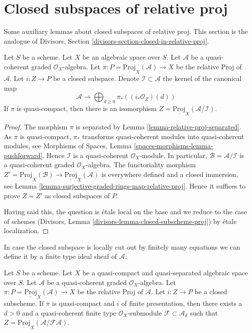 \section{Closed subspaces of relative proj}
\label{section-closed-in-relative-proj}

\noindent
Some auxiliary lemmas about closed subspaces of relative proj.
This section is the analogue of
Divisors, Section \ref{divisors-section-closed-in-relative-proj}.

\begin{lemma}
\label{lemma-closed-subscheme-proj}
Let $S$ be a scheme. Let $X$ be an algebraic space over $S$.
Let $\mathcal{A}$ be a quasi-coherent graded $\mathcal{O}_X$-algebra. Let
$\pi : P = \underline{\text{Proj}}_X(\mathcal{A}) \to X$ be the relative
Proj of $\mathcal{A}$. Let $i : Z \to P$ be a closed subspace. Denote
$\mathcal{I} \subset \mathcal{A}$ the kernel of the canonical map
$$
\mathcal{A}
\longrightarrow
\bigoplus\nolimits_{d \geq 0} \pi_*\left((i_*\mathcal{O}_Z)(d)\right)
$$
If $\pi$ is quasi-compact, then there is an isomorphism
$Z = \underline{\text{Proj}}_X(\mathcal{A}/\mathcal{I})$.
\end{lemma}

\begin{proof}
The morphism $\pi$ is separated by
Lemma \ref{lemma-relative-proj-separated}.
As $\pi$ is quasi-compact, $\pi_*$ transforms quasi-coherent modules
into quasi-coherent modules, see
Morphisms of Spaces, Lemma \ref{spaces-morphisms-lemma-pushforward}.
Hence $\mathcal{I}$ is a quasi-coherent $\mathcal{O}_X$-module.
In particular, $\mathcal{B} = \mathcal{A}/\mathcal{I}$ is a
quasi-coherent graded $\mathcal{O}_X$-algebra. The functoriality
morphism $Z' = \underline{\text{Proj}}_X(\mathcal{B}) \to
\underline{\text{Proj}}_X(\mathcal{A})$ is everywhere defined and
a closed immersion, see Lemma
\ref{lemma-surjective-graded-rings-map-relative-proj}.
Hence it suffices to prove $Z = Z'$ as closed subspaces of $P$.

\medskip\noindent
Having said this, the question is \'etale local on the base and we
reduce to the case of schemes
(Divisors, Lemma \ref{divisors-lemma-closed-subscheme-proj})
by \'etale localization.
\end{proof}

\noindent
In case the closed subspace is locally cut out by finitely many
equations we can define it by a finite type ideal sheaf of
$\mathcal{A}$.

\begin{lemma}
\label{lemma-closed-subscheme-proj-finite}
Let $S$ be a scheme. Let $X$ be a quasi-compact and quasi-separated
algebraic space over $S$.
Let $\mathcal{A}$ be a quasi-coherent graded $\mathcal{O}_X$-algebra. Let
$\pi : P = \underline{\text{Proj}}_X(\mathcal{A}) \to X$ be the relative
Proj of $\mathcal{A}$. Let $i : Z \to P$ be a closed subscheme.
If $\pi$ is quasi-compact and $i$ of finite presentation, then there exists
a $d > 0$ and a quasi-coherent finite type $\mathcal{O}_X$-submodule
$\mathcal{F} \subset \mathcal{A}_d$ such that
$Z = \underline{\text{Proj}}_X(\mathcal{A}/\mathcal{F}\mathcal{A})$.
\end{lemma}

